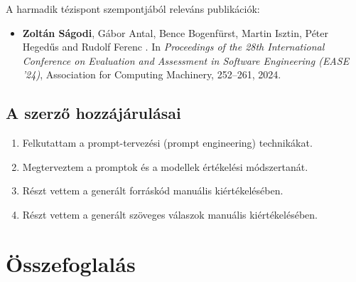 \documentclass[12pt,a4paper]{extarticle}
\begin{document}
\vspace{2em}

A harmadik tézispont szempontjából releváns publikációk:
\begin{itemize}
	\item \textbf{Zoltán Ságodi}, Gábor Antal, Bence Bogenfürst, Martin Isztin, Péter Heged\H{u}s and Rudolf Ferenc
	.
	\newblock In \emph{Proceedings of the 28th International Conference on Evaluation and Assessment in Software Engineering (EASE '24)}, Association for Computing Machinery, 252–261, 2024.
\end{itemize}

\subsection*{A szerző hozzájárulásai}

%

\begin{enumerate}[wide = 0pt, widest = {III/5.}, leftmargin =*]
	
	\item[III/1.] Felkutattam a prompt-tervezési (prompt engineering) technikákat.
	
	\item[III/2.] Megterveztem a promptok és a modellek értékelési módszertanát.
	
	\item[III/3.] Részt vettem a generált forráskód manuális kiértékelésében.
	
	\item[III/4.] Részt vettem a generált szöveges válaszok manuális kiértékelésében.
	
\end{enumerate}


\section*{Összefoglalás}
\end{document}
